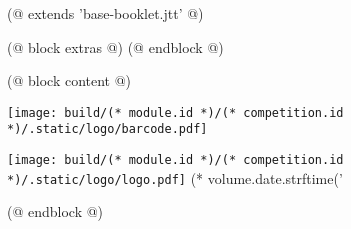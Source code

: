 (@ extends 'base-booklet.jtt' @)

(@ block extras @)
(@ endblock @)

(@ block content @)
    \pagestyle{empty}
    \begin{center}
        \null
        \vfill
        \texttt{[image: build/(* module.id *)/(* competition.id *)/.static/logo/barcode.pdf]}
    \end{center}
    \newpage
    \begin{center}
        \vspace*{20mm}
        \texttt{[image: build/(* module.id *)/(* competition.id *)/.static/logo/logo.pdf]}
        \vfill
        \fontsize{60}{25}\selectfont
        (* volume.date.strftime('%
    \end{center}
(@ endblock @)

